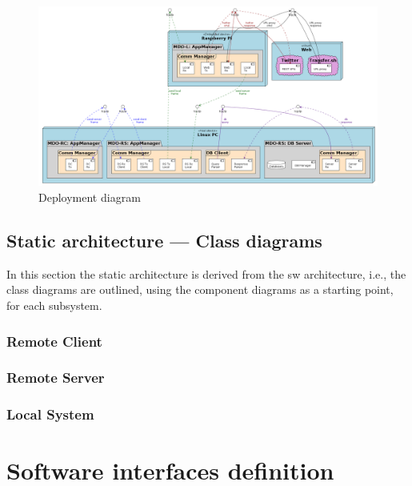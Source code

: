%
%
\begin{figure}[htb!]
\centering
    \includegraphics[width=1.0\columnwidth]{./img/deploy-diag.png}
  \caption{Deployment diagram}%
\label{fig:deploy-diag}
\end{figure}

\subsection{Static architecture --- Class diagrams}
\label{sec:stat-arch-class}
In this section the static architecture is derived from the \gls{sw}
architecture, i.e., the class diagrams are outlined, using the component
diagrams as a starting point, for each subsystem.

\subsubsection{Remote Client}
\label{sec:remote-client-class}

\subsubsection{Remote Server}
\label{sec:remote-server-class}

\subsubsection{Local System}
\label{sec:local-system-class}



\section{Software interfaces definition}
\label{sec:sw-interf-def}
%
% 

